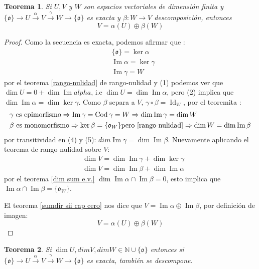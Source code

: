 \documentclass[14pt]{extarticle} %
\newtheorem{teorema}{Teorema}
\theoremstyle{problemastyle} %
\newcommand{\cero}{\mathfrak{o}} %
\newcommand{\bb}[1]{\mathbb{#1}}
\DeclareMathOperator{\im}{Im}
\DeclareMathOperator{\id}{Id}
\DeclareMathOperator{\cod}{Cod}
\begin{document}
\begin{teorema}
    Si $U,V$ y $W$ son espacios vectoriales de dimensión finita y  $\{\cero \} \xrightarrow {\;\;} U \xrightarrow{\;\alpha\;} V \xrightarrow{ \;\gamma\;} W \xrightarrow{\;\;} \{ \cero \}$ es exacta y $ \beta: W \longrightarrow V$ descomposición, entonces
    $$V = \alpha (U) \oplus \beta (W)$$
\end{teorema}
\begin{proof}
    Como la secuencia es exacta, podemos afirmar que :
    \begin{align}
        &\{\cero\}= \ker \alpha  \\
        &\im \alpha = \ker \gamma\\
        &\im \gamma = W
    \end{align}
    por el teorema \ref{rango-nulidad} de rango-nulidad y (1) podemos ver que $\dim U = 0 + \dim \im alpha $, i.e $ \dim U = \dim \im \alpha $, pero (2) implica que $\dim \im \alpha = \dim \ker \gamma $.
    Como $\beta$ separa a $V$, $\gamma  \circ \beta = \id_W $, por el teoremita :
    \begin{align}
        &\text {$\gamma$ es epimorfismo} \Rightarrow \im \gamma = \cod \gamma = W \Rightarrow \dim \im \gamma = \dim W\\
        &\text {$\beta$ es monomorfismo} \Rightarrow \ker \beta = \{ \cero_W \} \text{pero \ref{rango-nulidad}} \Rightarrow \dim W = \dim \im \beta 
    \end{align}
    por transitividad en (4) y (5): $dim \im \gamma = \dim \im \beta $.
    Nuevamente aplicando el teorema de rango nulidad sobre $V$:
    \begin{align*}
        &\dim V = \dim \im \gamma + \dim \ker \gamma\\
        &\dim V = \dim \im \beta + \dim \im \alpha 
    \end{align*}
    por el teorema \ref{dim sum e.v.} $\dim \im \alpha \cap \im \beta = 0$, esto implica que $\im \alpha \cap \im \beta = \{\cero_W\}$.

    El teorema \ref{sumdir sii cap cero} nos dice que $V=\im \alpha \oplus \im \beta$, por definición de imagen:
    $$V = \alpha(U)\oplus \beta (W)$$
\end{proof}

\begin{teorema}
    Si $\dim U,dim V, dim W \in \bb N \cup \{\cero\}$ entonces si $\{\cero \} \xrightarrow {\;\;} U \xrightarrow{\;\alpha\;} V \xrightarrow{ \;\gamma\;} W \xrightarrow{\;\;} \{ \cero \}$ es exacta, también se descompone.
\end{teorema}
\end{document}
